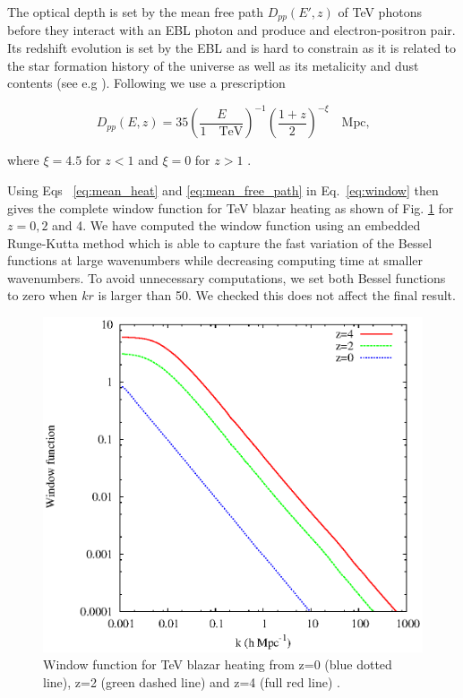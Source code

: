 \documentclass[onecolumn]{emulateapj}
\begin{document}
The optical depth is set by the mean free path  $D_{pp}(E',z)$ of  TeV photons before they interact with an EBL photon and produce and electron-positron pair. Its redshift evolution is set by the EBL and is hard to constrain as it is related to the star formation history of the universe as well as its metalicity and dust contents (see e.g \citet{2008A&A...487..837F,2006ApJ...648..774S}).  Following \citet{2012ApJ...752...23C} we use  a prescription 

  \begin{equation}
    \label{eq:mean_free_path}
  D_{pp}(E,z)=35\left(\frac{E}{1 \quad\textrm{TeV}}\right)^{-1} \left(\frac{1+z}{2}\right)^{-\xi} \quad \textrm{Mpc,}   
  \end{equation}

where $\xi=4.5$ for $z<1$ and $\xi=0$ for $z>1$ \citep{2004A&A...413..807K,2009PhRvD..80l3012N}. 

Using Eqs ~\ref{eq:mean_heat} and \ref{eq:mean_free_path} in Eq.~\ref{eq:window} then gives the complete window function for TeV blazar heating as shown of Fig. \ref{fig:window} for $z=0,2$ and 4. We have computed the window function using an embedded Runge-Kutta method which is able to capture the fast variation of the Bessel functions at large wavenumbers while decreasing computing time at smaller wavenumbers. To avoid unnecessary computations, we set both Bessel functions to zero when $kr$ is larger than 50. We checked this does not affect the final result.

\begin{figure}[h]
  \centering
  \includegraphics[width = .45\textwidth ]{full_window}
  \caption{Window function for TeV blazar heating from z=0 (blue dotted line), z=2 (green dashed line) and z=4 (full red line) .}
  \label{fig:window}
\end{figure}
\end{document}
